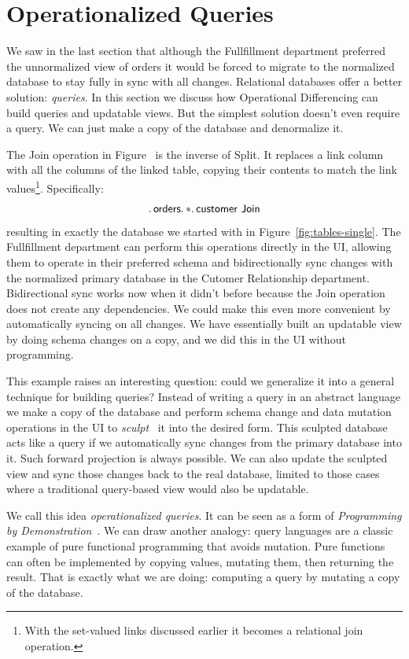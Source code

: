 \documentclass[english,submission]{programming}
\theoremstyle{definition}
\begin{document}
\section{Operationalized Queries}

We saw in the last section that although the Fullfillment department preferred the unnormalized view of orders it would be forced to migrate to the normalized database to stay fully in sync with all changes. Relational databases offer a better solution: \textit{queries}. In this section we discuss how Operational Differencing can build queries and updatable views. But the simplest solution doesn't even require a query. We can just make a copy of the database and denormalize it.

The \textsf{Join} operation in Figure~%
is the inverse of \textsf{Split}. It replaces a link column with all the columns of the linked table, copying their contents to match the link values\footnote{With the set-valued links discussed earlier it becomes a relational join operation.}. Specifically:
\[
\ldotp \textsf{orders}\ldotp * \ldotp \textsf{customer Join} \\
\]
resulting in exactly the database we started with in Figure~\ref{fig:tables-single}.
The Fullfillment department can perform this operations directly in the UI, allowing them
to operate in their preferred schema and bidirectionally sync changes with the normalized primary database in the Cutomer Relationship department. Bidirectional sync works now when it didn't before because the \textsf{Join} operation does not create any dependencies. We could make this even more convenient by automatically syncing on all changes. We have essentially built an updatable view by doing schema changes on a copy, and we did this in the UI without programming.

This example raises an interesting question: could we generalize it into a general technique for building queries? Instead of writing a query in an abstract language we make a copy of the database and perform schema change and data mutation operations in the UI to \textit{sculpt}~\cite{sculpin} it into the desired form. This sculpted database acts like a query if we automatically sync changes from the primary database into it. Such forward projection is always possible. We can also update the sculpted view and sync those changes back to the real database, limited to those cases where a traditional query-based view would also be updatable.

We call this idea \textit{operationalized queries}. It can be seen as a form of \textit{Programming by Demonstration}~\cite{cypher93-pbd}. We can draw another analogy: query languages are a classic example of pure functional programming that avoids mutation. Pure functions can often be implemented by copying values, mutating them, then returning the result. That is exactly what we are
doing: computing a query by mutating a copy of the database.
\end{document}
